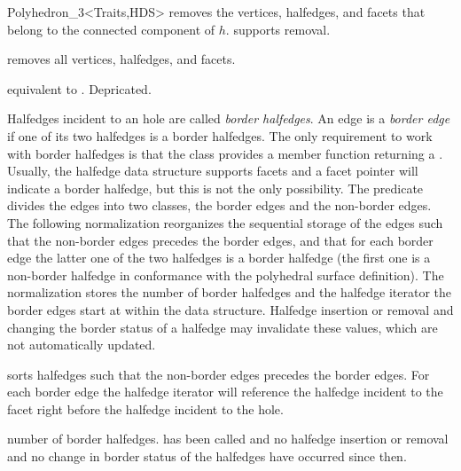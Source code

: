 \begin{ccClassTemplate}{Polyhedron_3<Traits,HDS>}
    {removes the  vertices, halfedges, and facets that belong to the 
     connected component of $h$. \ccPrecond {} supports removal.}

    {removes all vertices, halfedges, and facets.}

    {equivalent to . Depricated.}



\begin{ccAdvanced}
  
Halfedges incident to an hole are called {\em border halfedges}. An
edge is a {\em border edge\/} if one of its two halfedges is a border
halfedges. The only requirement to work with border halfedges is
that the  class provides a member function
 returning a . Usually, the halfedge data
structure supports facets and a  facet pointer will
indicate a border halfedge, but this is not the only possibility.
The  predicate divides the edges into two classes,
the border edges and the non-border edges. The following
normalization reorganizes the sequential storage of the edges such
that the non-border edges precedes the border edges, and that for
each border edge the latter one of the two halfedges is a border
halfedge (the first one is a non-border halfedge in conformance with
the polyhedral surface definition). The normalization stores the
number of border halfedges and the halfedge iterator the border
edges start at within the data structure.  Halfedge insertion or
removal and changing the border status of a halfedge may invalidate
these values, which are not automatically updated.


    {sorts halfedges such that the non-border edges precedes the
     border edges. For each border edge the halfedge iterator will
    reference the halfedge incident to the facet right before the
    halfedge incident to the hole.} 

    {number of border halfedges.
    \ccPrecond {} has been called and no
    halfedge insertion or removal and no change in border
    status of the halfedges have occurred since then.}


\end{ccAdvanced}
\end{ccClassTemplate}
